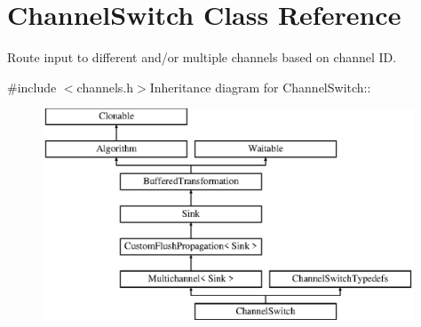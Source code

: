 \hypertarget{class_channel_switch}{
\section{ChannelSwitch Class Reference}
\label{class_channel_switch}
}


Route input to different and/or multiple channels based on channel ID.  


{\ttfamily \#include $<$channels.h$>$}Inheritance diagram for ChannelSwitch::\begin{figure}[H]
\begin{center}
\leavevmode
\includegraphics[height=6.28205cm]{class_channel_switch}
\end{center}
\end{figure}
